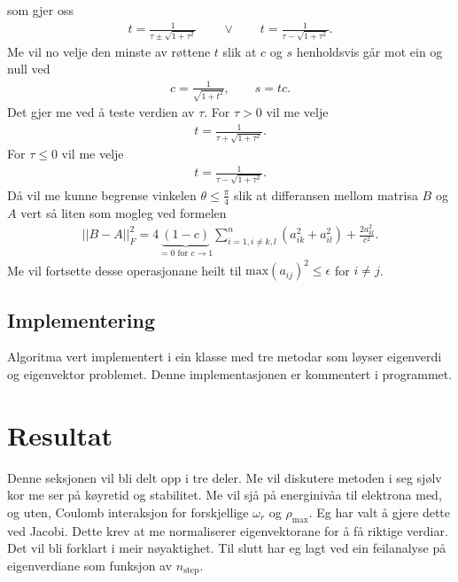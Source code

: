 \documentclass[11pt, a4paper]{article}
\begin{document}
    som gjer oss
    \begin{align*}
      t = \frac{1}{\tau \pm \sqrt{1 + \tau^2}} \qquad \lor \qquad t = \frac{1}{\tau - \sqrt{1 + \tau^2}}.
    \end{align*}
    Me vil no velje den minste av røttene $t$ slik at $c$ og $s$ henholdsvis går mot ein og null ved
    \begin{align*}
      c = \frac{1}{\sqrt{1 + t^2}}, \qquad s = tc.
    \end{align*}
    Det gjer me ved å teste verdien av $\tau$. For $\tau > 0$ vil me velje 
    \begin{align*}
      t = \frac{1}{\tau + \sqrt{1 + \tau^2}}.
    \end{align*}
    For $\tau \leq 0$ vil me velje
    \begin{align*}
      t = \frac{1}{\tau - \sqrt{1 + \tau^2}}.
    \end{align*}
    Då vil me kunne begrense vinkelen $\theta \leq \frac{\pi}{4}$ slik at differansen mellom matrisa $B$ og $A$ vert så liten som mogleg ved formelen
    \begin{align*}
      \lvert\lvert B - A \rvert\rvert_F^2 = 4\underbrace{(1 - c)}_{= 0 \text{ for } c \to 1}\sum_{i = 1, i\ne k, l}^n(a_{ik}^2 + a_{il}^2) + \frac{2a_{kl}^2}{c^2}.
    \end{align*}
    Me vil fortsette desse operasjonane heilt til $\text{max}(a_{ij})^2 \leq \epsilon$ for $i \ne j$.

  \subsection{Implementering}
    Algoritma vert implementert i ein klasse med tre metodar som løyser eigenverdi og eigenvektor problemet. Denne implementasjonen er kommentert i programmet.



\section{Resultat}
  Denne seksjonen vil bli delt opp i tre deler. Me vil diskutere metoden i seg sjølv kor me ser på køyretid og stabilitet. %
  Me vil sjå på energinivåa til elektrona med, og uten, Coulomb interaksjon for forskjellige $\omega_r$ og $\rho_{\text{max}}$. Eg har valt å gjere dette 
  ved Jacobi. Dette krev at me normaliserer eigenvektorane for å få riktige verdiar. Det vil bli forklart i meir nøyaktighet. %
  Til slutt har eg lagt ved ein feilanalyse på eigenverdiane som funksjon av $n_{\text{step}}$.
\end{document}
